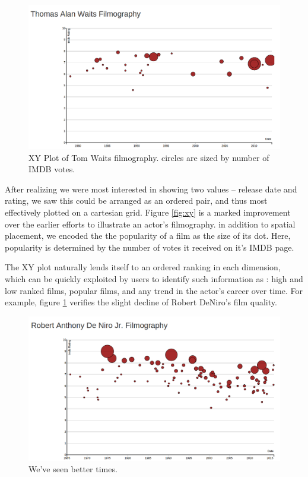 \documentclass[12pt]{article}
\begin{document}
\begin{figure}
	\centering
	\includegraphics[width=.7\linewidth]{images/timelineC_crop_waits.png}
				  \caption{XY Plot of Tom Waits filmography.  circles are sized by number of  IMDB votes.}
\end{figure}\label{fig:xy}


After realizing we were most interested in showing two values -- release date and rating, we saw this could be arranged as an ordered pair, and thus most effectively plotted on a cartesian grid.  Figure \ref{fig:xy} is a marked improvement over the earlier efforts to illustrate an actor's filmography.  in addition to spatial placement, we encoded the the popularity of a film as the size of its dot.  Here, popularity is determined by the number of votes it received on it's IMDB page.

The XY plot naturally lends itself to an ordered ranking in each dimension, which can be quickly exploited by users to identify such information as : high and low ranked films, popular films, and any trend in the actor's career over time.  For example, figure \ref{fig:deniro} verifies the slight decline of  Robert DeNiro's film quality.

\begin{figure}\label{fig:deniro}
	\centering
	\includegraphics[width=.7\linewidth]{images/Deniro_timeline.png}
				  \caption{We've seen better times.}
\end{figure}
\end{document}
